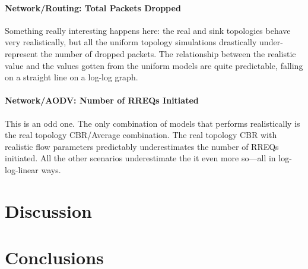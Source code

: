 \documentclass{article}
\begin{document}
\paragraph{Network/Routing: Total Packets Dropped}

Something really interesting happens here: the real and sink topologies behave very realistically, but all the uniform topology simulations drastically under-represent the number of dropped packets. The relationship between the realistic value and the values gotten from the uniform models are quite predictable, falling on a straight line on a log-log graph.

\paragraph{Network/AODV: Number of RREQs Initiated}

This is an odd one. The only combination of models that performs realistically is the real topology CBR/Average combination. The real topology CBR with realistic flow parameters predictably underestimates the number of RREQs initiated. All the other scenarios underestimate the it even more so—all in log-log-linear ways.

\section{Discussion}

\section{Conclusions}
\end{document}
